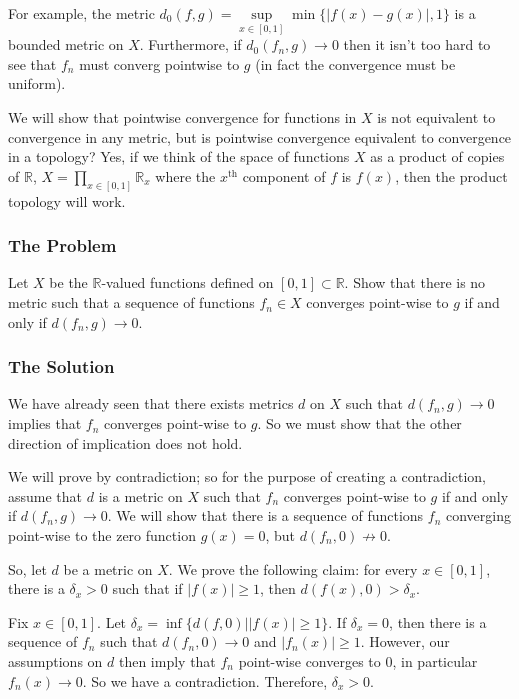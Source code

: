 For example, the metric \(d_0(f, g) = \sup\limits_{x\in [0,1]} \min \{|f(x) - g(x)|, 1\}\) is a bounded metric on \(X\).
Furthermore, if \(d_0(f_n, g) \to 0\) then it isn't too hard to see that \(f_n\) must converg pointwise to \(g\) 
(in fact the convergence must be uniform). 

We will show that pointwise convergence for functions in \(X\) is not equivalent to convergence in any metric, but is
pointwise convergence equivalent to convergence in a topology? Yes, if we think of the space of functions \(X\) as a 
product of copies of \(\mathbb R\),  \(X = \prod\limits_{x\in [0,1]} \mathbb R_x\) where the \(x^\text{th}\) 
component of \(f\) is \(f(x)\), then the product topology will work. 

\subsubsection*{The Problem}

Let \(X\) be the \(\mathbb R\)-valued functions defined on \([0,1]\subset\mathbb R\). Show that there is no metric
such that a sequence of functions \(f_n \in X\) converges point-wise to \(g\) if and only if \(d(f_n, g) \to 0\). 

\subsubsection*{The Solution}

We have already seen that there exists metrics \(d\) on \(X\) such that \(d(f_n, g) \to 0\) implies that 
\(f_n\) converges point-wise to \(g\). So we must show that the other direction of implication does not hold.

We will prove by contradiction; so for the purpose of creating a contradiction, assume that \(d\) is a metric
on \(X\) such that \(f_n\) converges point-wise to \(g\) if and only if \(d(f_n, g) \to 0\). We will show that there is a sequence of functions \(f_n\) converging point-wise
to the zero function \(g(x) = 0\), but \(d(f_n, 0) \not \to 0\).

So, let \(d\) be a metric on \(X\). We prove the following claim: for every \(x \in [0, 1]\), there is a 
\(\delta_x > 0\) such that if \(|f(x)| \geq 1\), then \(d(f(x), 0) > \delta_x\).

Fix \(x \in [0,1]\). Let \(\delta_x = \inf \{d(f, 0) | |f(x)| \geq 1\}\). If \(\delta_x = 0\), then there is a 
sequence of \(f_n\) such that \(d(f_n, 0)\to 0\) and \(|f_n(x)|\geq 1\). However, our assumptions on \(d\) then imply
that \(f_n\) point-wise converges to \(0\), in particular \(f_n(x) \to 0\). So we have a contradiction. Therefore,
\(\delta_x > 0\).

